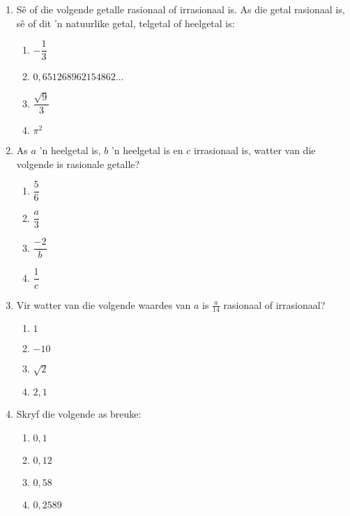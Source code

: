 \begin{exercises}{}{
\begin{enumerate}[itemsep=5pt, label=\textbf{\arabic*}. ] 
\item Sê of die volgende getalle rasionaal of irrasionaal is. As die getal rasionaal is, sê of dit 'n natuurlike getal, telgetal of heelgetal is:
\begin{enumerate}[itemsep=5pt, label=\textbf{(\alph*)} ] 
    \item $-\dfrac{1}{3}$
    \item $0,651268962154862\ldots$
    \item $\dfrac{\sqrt{9}}{3}$
    \item $\pi^2$
\end{enumerate}
\item As $a$ 'n heelgetal is, $b$ 'n heelgetal is en $c$ irrasionaal is, watter van die volgende is rasionale getalle? 
  \begin{enumerate}[itemsep=5pt, label=\textbf{\alph*}. ] 
    \item $\dfrac{5}{6}$
    \item $\dfrac{a}{3}$
    \item $\dfrac{-2}{b}$
    \item $\dfrac{1}{c}$
    \end{enumerate}
\item Vir watter van die volgende waardes van $a$ is $\frac{a}{14}$ rasionaal of irrasionaal?
    \begin{enumerate}[itemsep=5pt, label=\textbf{\alph*}. ] 
    \item $1$
    \item $-10$
    \item $\sqrt{2}$
    \item $2,1$
    \end{enumerate}

\item Skryf die volgende as breuke:
    \begin{enumerate}[itemsep=5pt, label=\textbf{\alph*}. ] 
    \item $0,1$
    \item $0,12$
    \item $0,58$
    \item $0,2589$
    \end{enumerate}


\end{enumerate}}
\end{exercises}
